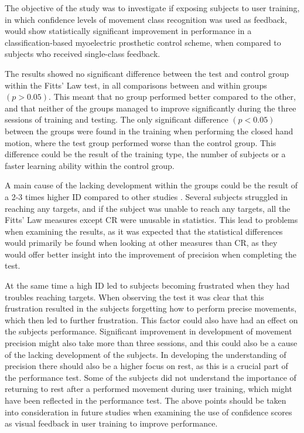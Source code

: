 The objective of the study was to investigate if exposing subjects to user training, in which confidence levels of movement class recognition was used as feedback, would show statistically significant improvement in performance in a classification-based myoelectric prosthetic control scheme, when compared to subjects who received single-class feedback.

The results showed no significant difference between the test and control group within the Fitts' Law test, in all comparisons between and within groups $(p > 0.05)$. This meant that no group performed better compared to the other, and that neither of the groups managed to improve significantly during the three sessions of training and testing. The only significant difference $(p < 0.05)$ between the groups were found in the training when performing the closed hand motion, where the test group performed worse than the control group. This difference could be the result of the training type, the number of subjects or a faster learning ability within the control group.

A main cause of the lacking development within the groups could be the result of a 2-3 times higher ID compared to other studies \cite{Scheme2013,Scheme2013a}. Several subjects struggled in reaching any targets, and if the subject was unable to reach any targets, all the Fitts' Law measures except CR were unusable in statistics. This lead to problems when examining the results, as it was expected that the statistical differences would primarily be found when looking at other measures than CR, as they would offer better insight into the improvement of precision when completing the test. 

At the same time a high ID led to subjects becoming frustrated when they had troubles reaching targets. When observing the test it was clear that this frustration resulted in the subjects forgetting how to perform precise movements, which then led to further frustration. This factor could also have had an effect on the subjects performance. Significant improvement in development of movement precision might also take more than three sessions, and this could also be a cause of the lacking development of the subjects. In developing the understanding of precision there should also be a higher focus on rest, as this is a crucial part of the performance test. Some of the subjects did not understand the importance of returning to rest after a performed movement during user training, which might have been reflected in the performance test.
The above points should be taken into consideration in future studies when examining the use of confidence scores as visual feedback in user training to improve performance.

